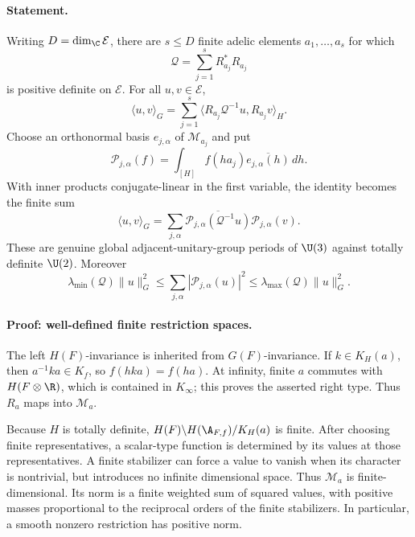 \documentclass[11pt]{article}
\theoremstyle{definition}\newtheorem{definition}[theorem]{Definition}\newtheorem{remark}[theorem]{Remark}
\begin{document}
\paragraph{Statement.}
Writing $D=\dim_\C\mathcal E$, there are $s\leq D$ finite adelic
elements $a_1,\ldots,a_s$ for which
\[
 \mathcal Q=\sum_{j=1}^sR_{a_j}^*R_{a_j}
\]
is positive definite on $\mathcal E$. For all $u,v\in\mathcal E$,
\begin{equation}\label{A5-frame}
 \langle u,v\rangle_G
  =\sum_{j=1}^s
          \langle R_{a_j}\mathcal Q^{-1}u,R_{a_j}v\rangle_H.
\end{equation}
Choose an orthonormal basis $e_{j,\alpha}$ of $\mathcal M_{a_j}$ and
put
\[
 \mathcal P_{j,\alpha}(f)=
    \int_{[H]}f(ha_j)\overline{e_{j,\alpha}(h)}\,dh.
\]
With inner products conjugate-linear in the first variable, the
identity becomes the finite sum
\begin{equation}\label{A5-periods}
 \langle u,v\rangle_G
  =\sum_{j,\alpha}
       \overline{\mathcal P_{j,\alpha}(\mathcal Q^{-1}u)}
                   \mathcal P_{j,\alpha}(v).
\end{equation}
These are genuine global adjacent-unitary-group periods of $\U(3)$
against totally definite $\U(2)$. Moreover
\begin{equation}\label{A5-bounds}
 \lambda_{\min}(\mathcal Q)\|u\|_G^2
 \leq\sum_{j,\alpha}|\mathcal P_{j,\alpha}(u)|^2
 \leq\lambda_{\max}(\mathcal Q)\|u\|_G^2.
\end{equation}

\paragraph{Proof: well-defined finite restriction spaces.}
The left $H(F)$-invariance is inherited from $G(F)$-invariance. If
$k\in K_H(a)$, then $a^{-1}ka\in K_f$, so
$f(hka)=f(ha)$. At infinity, finite $a$ commutes with $H(F\otimes\R)$,
which is contained in $K_\infty$; this proves the asserted right type.
Thus $R_a$ maps into $\mathcal M_a$.

Because $H$ is totally definite,
$H(F)\backslash H(\A_{F,f})/K_H(a)$ is finite. After choosing finite
representatives, a scalar-type function is determined by its values
at those representatives. A finite stabilizer can force a value to
vanish when its character is nontrivial, but introduces no infinite
dimensional space. Thus $\mathcal M_a$ is finite-dimensional. Its
norm is a finite weighted sum of squared values, with positive masses
proportional to the reciprocal orders of the finite stabilizers. In
particular, a smooth nonzero restriction has positive norm.
\end{document}
